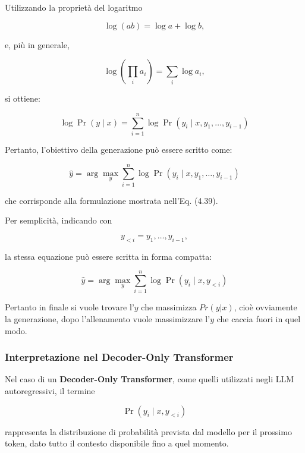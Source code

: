 Utilizzando la proprietà del logaritmo

\begin{equation}
\log(ab)=\log a+\log b,
\end{equation}

e, più in generale,

\begin{equation}
\log\left(\prod_i a_i\right)
=
\sum_i \log a_i,
\end{equation}

si ottiene:

\begin{equation}
\boxed{
\log \Pr(y\mid x)
=
\sum_{i=1}^{n}
\log
\Pr(y_i\mid x,y_1,\ldots,y_{i-1})
}
\end{equation}

Pertanto, l'obiettivo della generazione può essere scritto come:

\begin{equation}
\boxed{
\hat{y}
=
\arg\max_y
\sum_{i=1}^{n}
\log
\Pr(y_i\mid x,y_1,\ldots,y_{i-1})
}
\end{equation}

che corrisponde alla formulazione mostrata nell'Eq. (4.39).

Per semplicità, indicando con

\[
y_{<i}=y_1,\ldots,y_{i-1},
\]

la stessa equazione può essere scritta in forma compatta:

\begin{equation}
\boxed{
\hat{y}
=
\arg\max_y
\sum_{i=1}^{n}
\log
\Pr(y_i\mid x,y_{<i})
}
\end{equation}

Pertanto in finale si vuole trovare l'$y$ che massimizza $Pr(y | x)$, cioè ovviamente la generazione, dopo l'allenamento vuole massimizzare l'$y$ che caccia fuori in quel modo.

\subsubsection*{Interpretazione nel Decoder-Only Transformer}

Nel caso di un \textbf{Decoder-Only Transformer}, come quelli utilizzati negli LLM autoregressivi, il termine

\[
\Pr(y_i\mid x,y_{<i})
\]

rappresenta la distribuzione di probabilità prevista dal modello per il prossimo token, dato tutto il contesto disponibile fino a quel momento.

